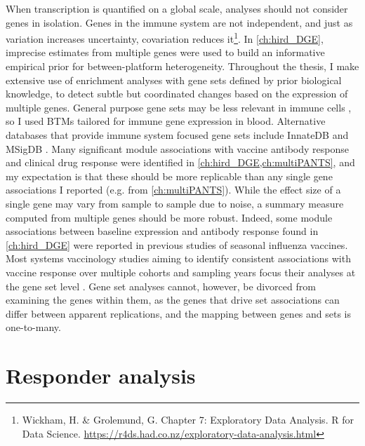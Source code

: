 When transcription is quantified on a global scale, analyses should not consider genes in isolation.
Genes in the immune system are not independent, and just as variation increases uncertainty, covariation reduces it\footnote{Wickham, H. \& Grolemund, G. Chapter 7: Exploratory Data Analysis. R for Data Science. \url{https://r4ds.had.co.nz/exploratory-data-analysis.html}}.
In \cref{ch:hird_DGE}, imprecise estimates from multiple genes were used to build an informative empirical prior for between-platform heterogeneity.
Throughout the thesis, I make extensive use of enrichment analyses with gene sets defined by prior biological knowledge,
to detect subtle but coordinated changes based on the expression of multiple genes.
General purpose gene sets may be less relevant in immune cells \autocite{nakaya2015SystemsAnalysisImmunity}, 
so I used \glspl{BTM} \autocite{chaussabel2008ModularAnalysisFramework,li2013MolecularSignaturesAntibody} tailored for immune gene expression in blood.
Alternative databases that provide immune system focused gene sets include InnateDB \autocite{breuer2013InnateDBSystemsBiology} and MSigDB \autocite{liberzon2011MolecularSignaturesDatabase}.
Many significant module associations with vaccine antibody response and clinical drug response were identified in \cref{ch:hird_DGE,ch:multiPANTS},
and my expectation is that these should be more replicable than any single gene associations I reported (e.g.  from \cref{ch:multiPANTS}).
While the effect size of a single gene may vary from sample to sample due to noise, 
a summary measure computed from multiple genes should be more robust.
Indeed, some module associations between baseline expression and antibody response found in \cref{ch:hird_DGE} were reported in previous studies of seasonal influenza vaccines.
Most systems vaccinology studies aiming to identify consistent associations with vaccine response over multiple cohorts and sampling years focus their analyses at the gene set level \autocite{tsang2020ImprovingVaccineinducedImmunity}.
Gene set analyses cannot, however, be divorced from examining the genes within them,
as the genes that drive set associations can differ between apparent replications,
and the mapping between genes and sets is one-to-many.

\section{Responder analysis}

